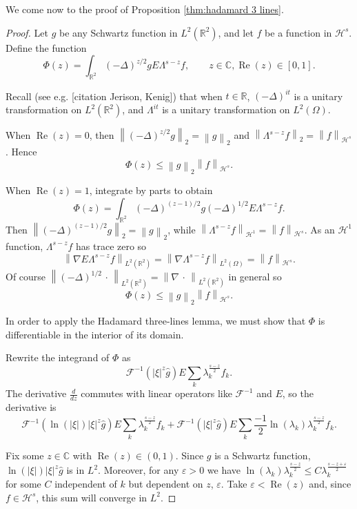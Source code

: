 \documentclass[11pt]{amsart}
\theoremstyle{remark}
\theoremstyle{definition}
\newcommand{\R}{\mathbb{R}}
\newcommand{\C}{\mathbb{C}}
\newcommand{\Four}{\mathcal{F}}
\newcommand{\eps}{\varepsilon}
\newcommand{\norm}[1]{\left\lVert#1\right\rVert}
\newcommand{\paren}[1]{\left( #1 \right)}
\newcommand{\grad}{\nabla}
\newcommand{\Laplace}{\Delta}
\renewcommand{\Re}{\operatorname{Re}}
\newcommand{\ddz}{\frac{d}{dz}}
\newcommand{\n}{^{-1}}
\newcommand{\HD}{\mathcal{H}}
\begin{document}
We come now to the proof of Proposition \ref{thm:hadamard 3 lines}.  
\begin{proof}
Let $g$ be any Schwartz function in $L^2(\R^2)$, and let $f$ be a function in $\HD^s$.  
Define the function
\[ \Phi(z) = \int_{\R^2} \paren{-\Laplace}^{z/2} g E \Lambda^{s-z} f, \qquad z \in \C, \Re(z) \in [0,1]. \]

Recall (see e.g. [citation Jerison, Kenig]) that when $t \in \R$, $(-\Laplace)^{i t}$ is a unitary transformation on $L^2(\R^2)$, and $\Lambda^{i t}$ is a unitary transformation on $L^2(\Omega)$.  

When $\Re(z) = 0$, then $\norm{\paren{-\Laplace}^{z/2} g}_2 = \norm{g}_2$ and $\norm{\Lambda^{s-z} f}_2 = \norm{f}_{\HD^s}$.  Hence
\[ \Phi(z) \leq \norm{g}_2 \norm{f}_{\HD^s}. \]

When $\Re(z)=1$, integrate by parts to obtain
\[ \Phi(z) = \int_{\R^2} \paren{-\Laplace}^{(z-1)/2} g  \paren{-\Laplace}^{1/2} E \Lambda^{s-z} f. \]
Then $\norm{\paren{-\Laplace}^{(z-1)/2} g}_2 = \norm{g}_2$, while $\norm{\Lambda^{s-z} f}_{\HD^1} = \norm{f}_{\HD^s}$.  As an $\HD^1$ function, $\Lambda^{s-z} f$ has trace zero so 
\[ \norm{\grad E \Lambda^{s-z} f}_{L^2(\R^2)} = \norm{\grad \Lambda^{s-z} f}_{L^2(\Omega)} = \norm{f}_{\HD^s}. \]
Of course $\norm{\paren{-\Laplace}^{1/2} \,\cdot\,}_{L^2(\R^2)} = \norm{\grad \,\cdot\,}_{L^2(\R^2)}$ in general so
\[ \Phi(z) \leq \norm{g}_2 \norm{f}_{\HD^s}. \]

In order to apply the Hadamard three-lines lemma, we must show that $\Phi$ is differentiable in the interior of its domain.  

Rewrite the integrand of $\Phi$ as
\[ \Four\n\paren{ |\xi|^z \hat{g} } E \sum_k \lambda_k^{\frac{s-z}{2}} f_k. \]
The derivative $\ddz$ commutes with linear operators like $\Four\n$ and $E$, so the derivative is
\begin{equation} \label{derivative of integrand} \Four\n\paren{ \ln(|\xi|) |\xi|^z \hat{g} } E \sum_k \lambda_k^{\frac{s-z}{2}} f_k + \Four\n\paren{ |\xi|^z \hat{g} } E \sum_k \frac{-1}{2} \ln(\lambda_k) \lambda_k^{\frac{s-z}{2}} f_k. \end{equation}

Fix some $z \in \C$ with $\Re(z) \in (0,1)$.  Since $g$ is a Schwartz function, $\ln(|\xi|)|\xi|^z \hat{g}$ is in $L^2$.  Moreover, for any $\eps>0$ we have $\ln(\lambda_k) \lambda_k^{\frac{s-z}{2}} \leq C \lambda_k^{\frac{s-z+\eps}{2}}$ for some $C$ independent of $k$ but dependent on $z$, $\eps$.  Take $\eps < \Re(z)$ and, since $f \in \HD^{s}$, this sum will converge in $L^2$.  


\end{proof}
\end{document}
